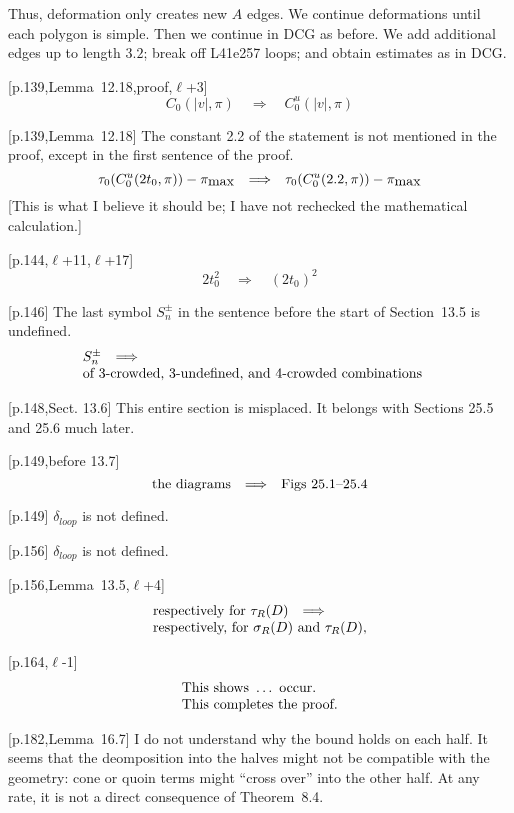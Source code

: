 \documentclass[11pt]{amsart}
\def\to{{\quad\Longrightarrow\quad}}
\def\line{$\ell$}
\def\text{\hbox}
\begin{document}
Thus, deformation only creates new $A$ edges.  We continue deformations until each polygon is simple.  Then we continue in DCG as before.  We add additional edges up to length $3.2$; break off L41e257 loops; and obtain estimates as in DCG.



[p.139,Lemma~12.18,proof,\line+3] 
	$$C_0(|v|,\pi) \to
	C_0^u(|v|,\pi)
	$$
	
[p.139,Lemma~12.18] The constant 2.2 of the
statement is not mentioned in the proof, except
in the first sentence of the proof.
	$$
	\tau_0(C_0^u(2t_0,\pi))-\pi_{\text{max}}\to
	\tau_0(C_0^u(2.2,\pi))-\pi_{\text{max}}
	$$
[This is what I believe it should be; I have
not rechecked the mathematical calculation.]

[p.144,\line+11,\line+17]
	$$2t_0^2 \to (2t_0)^2
	$$


[p.146] The last symbol $S_n^\pm$ in the
sentence before the start of 
Section~13.5 is undefined.
	$$\begin{array}{lll}
	S_n^\pm \to&\\
	\text{of 3-crowded, 3-undefined, and
	4-crowded combinations} 
	\end{array}
	$$
	
[p.148,Sect. 13.6]  This entire
section is misplaced.  It belongs with
Sections 25.5 and 25.6 much later.

[p.149,before 13.7]
	$$
	\text{the diagrams}\to
	\text{Figs~25.1--25.4}
	$$
	
[p.149] $\delta_{loop}$ is not defined.

[p.156] $\delta_{loop}$ is not defined.

[p.156,Lemma~13.5,\line+4]
	$$
	\begin{array}{lll}
	\text{respectively for }\tau_R(D)\to\\
	\text{respectively, for }\sigma_R(D) \text{ and }
	\tau_R(D),  
	\end{array}
	$$
	
[p.164,\line-1] 
	$$
	\begin{array}{lll}
	\text{This shows }\ldots \text{ occur.}\\
	\text{This completes the proof.}
	\end{array}
	$$
	
[p.182,Lemma~16.7]  I do not understand why
the bound holds on each half.  It seems that
the deomposition into the halves might not be
compatible with the geometry: cone or quoin
terms might ``cross over'' into the other half.
At any rate, it is not a direct consequence
of Theorem~8.4.
\end{document}
